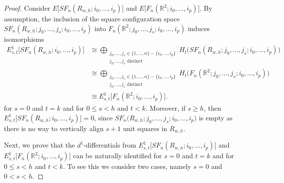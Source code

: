 \documentclass[pagebackref,colorlinks,citecolor=blue,linkcolor=blue,urlcolor=blue,filecolor=blue]{article}
\theoremstyle{definition}\newtheorem{definition}[thm]{Definition}
\theoremstyle{definition}
\newcommand{\R}{\ensuremath{\mathbb{R}}}
\begin{document}
\begin{proof}
Consider $E\big[SF_{n}(R_{w,h};i_{0}, \dots, i_{p})\big]$ and $E\big[F_{n}(\R^{2};i_{0}, \dots, i_{p})\big]$.
By assumption, the inclusion of the square configuration space $SF_{n}(R_{w, h}; j_{0}, \dots, j_{s}; i_{0}, \dots, i_{p})$ into $F_{n}(\R^{2}; j_{0}, \dots, j_{s}; i_{0}, \dots, i_{p})$ induces isomorphisms
\begin{align*}
E^{1}_{s,t}\big[SF_{n}(R_{w,h};i_{0}, \dots, i_{p})\big]&\cong\bigoplus_{\substack{j_{0}, \dots, j_{s}\in \{1,\dots, n\}-\{i_{0}, \dots, i_{p}\}\\j_{0}, \dots, j_{s} \text{ distinct}}} H_{t}\big(SF_{n}(R_{w, h}; j_{0}, \dots, j_{s}; i_{0}, \dots, i_{p})\big)\\
&\cong \bigoplus_{\substack{j_{0}, \dots, j_{s}\in \{1,\dots, n\}-\{i_{0}, \dots, i_{p}\}\\j_{0}, \dots, j_{s} \text{ distinct}}} H_{t}\big(F_{n}(\R^{2}; j_{0}, \dots, j_{s}; i_{0}, \dots, i_{p})\big)\\
&\cong E^{1}_{s,t}\big[F_{n}(\R^{2};i_{0}, \dots, i_{p})\big].
\end{align*}
for $s=0$ and $t=k$ and for $0\le s<h$ and $t<k$.
Moreover, if $s\ge h$, then $E^{1}_{s,t}\big[SF_{n}(R_{w,h}; i_{0},\dots, i_{p})\big]=0$, since $SF_{n}\big(R_{w,h}; j_{0}, \dots, j_{s}; i_{0}, \dots, i_{p})$ is empty as there is no way to vertically align $s+1$ unit squares in $R_{w,h}$. 

Next, we prove that the $d^{1}$-differentials from $E^{1}_{s,t}\big[SF_{n}(R_{w,h};i_{0}, \dots, i_{p})\big]$ and $E^{1}_{s,t}\big[F_{n}(\R^{2};i_{0}, \dots, i_{p})\big]$ can be naturally identified for $s=0$ and $t=k$ and for $0\le s<h$ and $t<k$.
To see this we consider two cases, namely $s=0$ and $0<s<h$.


\end{proof}
\end{document}
